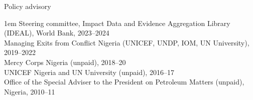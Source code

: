 \documentclass[10.9pt]{article}
\makeatletter
\newcommand\donotbreakhere{\par\nobreak\@afterheading\vspace{1em}}
\newcommand{\complete}{1}
\newcommand{\years}[1]{\marginnote{\scriptsize #1}}
\newenvironment{indnt}{\begin{adjustwidth}{1em}{}}{\end{adjustwidth}}
\makeatother
\begin{document}
{\large Policy advisory} \donotbreakhere
\begin{indnt}
Steering committee, Impact Data and Evidence Aggregation Library (IDEAL), World Bank, 2023--2024\\[0.75em]
Managing Exits from Conflict Nigeria (UNICEF, UNDP, IOM, UN University), 2019--2022  \\[.75em]
Mercy Corps Nigeria (unpaid), 2018--20  \\[.75em]
UNICEF Nigeria and UN University (unpaid), 2016--17  \\[.75em]
Office of the Special Adviser to the President on Petroleum Matters (unpaid), Nigeria, 2010--11
\end{indnt}
\vspace{1.5em}

\end{document}
